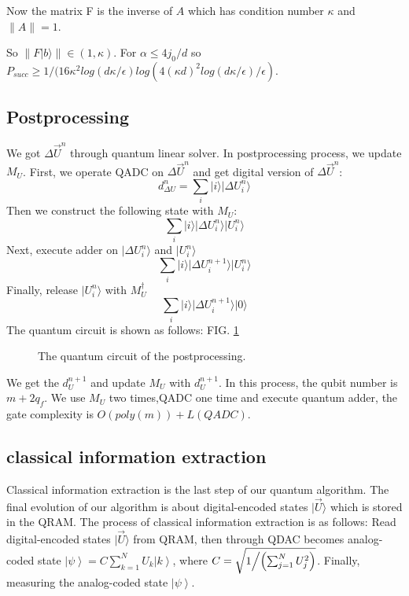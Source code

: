 \documentclass[%
 reprint,
 amsmath,amssymb,
pra,
]{revtex4-1}
\begin{document}
\begin{itemize}
Now the matrix F is the inverse of $A$ 
which has condition number $\kappa$ and $\lVert A\rVert=1$. 

So $\lVert F|b\rangle\rVert\in (1, \kappa)$. For $\alpha\leqslant4j_0/d$ so
$P_{succ}\geqslant 1/(16\kappa^2 log(d\kappa/\epsilon) log(4(\kappa d)^2log(d
\kappa/\epsilon)/\epsilon)$. 


\subsection{Postprocessing}

We got $\Delta \vec{U}^n$ through quantum linear solver. In postprocessing process, we update $M_U$. First, we operate QADC on $\Delta \vec{U}^n$ and get digital version of $\Delta \vec{U}^n$:
$$
d_{\Delta U}^n=\sum_i{|i\rangle|\Delta U_i^n\rangle}
$$
Then we construct the following state with $M_U$:
$$
\sum_i{|i\rangle|\Delta U_i^n\rangle|U_i^n\rangle}
$$
Next, execute adder on $|\Delta U_i^n\rangle$ and $|U_i^n\rangle$
$$
\sum_i{|i\rangle|\Delta U_i^{n+1}\rangle|U_i^n\rangle}
$$
Finally, release $|U_i^n\rangle$ with $M_U^{\dagger}$
$$
\sum_i{|i\rangle|\Delta U_i^{n+1}\rangle|0\rangle}
$$
The quantum circuit is shown as follows: FIG. \ref{postprocessing_qcir}
\begin{figure}[htbp]
	 \caption{The quantum circuit of the postprocessing.}
	\label{postprocessing_qcir}
   \end{figure}
We get the $d_U^{n+1}$ and update $M_U$ with $d_U^{n+1}$. In this process, the qubit number is $m+2q_f$. We use $M_U$ two times,QADC one time and execute quantum adder, the gate complexity is $O(poly(m))+L(QADC)$.


\subsection{classical information extraction}
Classical information extraction is the last step of our quantum algorithm. 
The final evolution of our algorithm is about digital-encoded states
$|\vec{U}\rangle$ which is stored in the QRAM. 
The process of classical information extraction is as follows: 
Read digital-encoded states $|\vec{U}\rangle$ from QRAM, 
then through QDAC becomes analog-coded state $\left| \psi  \right\rangle  = C\sum\limits_{k = 1}^N {{U_k}\left| k \right\rangle } $,
where $C = \sqrt {{1 \mathord{\left/
{\vphantom {1 {\left( {\sum\nolimits_{j = 1}^N {U_j^2} } \right)}}} \right.
\kern-\nulldelimiterspace} {\left( {\sum\nolimits_{j = 1}^N {U_j^2} } \right)}}} $.
Finally, measuring the analog-coded state $\left| \psi  \right\rangle $.


\end{itemize}
\end{document}
